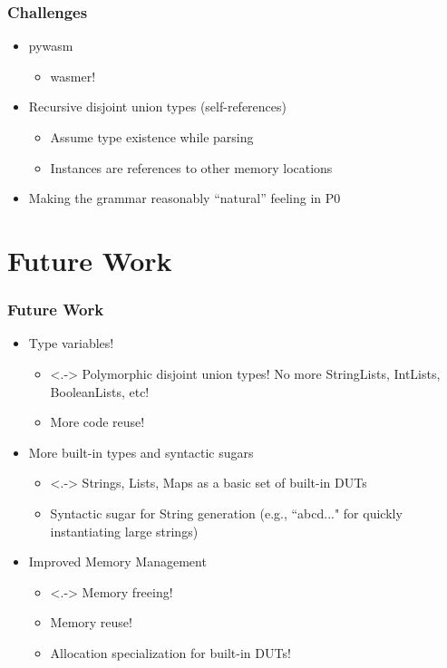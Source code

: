 \documentclass{beamer}
\begin{document}
\begin{frame}
 \frametitle{Challenges}
 \begin{itemize}
  \item<1-> pywasm
  \begin{itemize}
    \item<2-> wasmer!
  \end{itemize}
  
  \item<3-> Recursive disjoint union types (self-references)
  \begin{itemize}
    \item<4-> Assume type existence while parsing
    \item<5-> Instances are references to other memory locations
  \end{itemize}
  
  \item<6-> Making the grammar reasonably ``natural'' feeling in P0
 \end{itemize}

\end{frame}


\section{Future Work}

\begin{frame}
\frametitle{Future Work}

\begin{itemize}
 \item<1-> Type variables!
 \begin{itemize}
  \item<.-> Polymorphic disjoint union types! No more StringLists, IntLists, BooleanLists, etc!
  \item More code reuse!
 \end{itemize}
 
 \item<2-> More built-in types and syntactic sugars
 \begin{itemize}
 \item<.-> Strings, Lists, Maps as a basic set of built-in DUTs
 \item Syntactic sugar for String generation (e.g., ``abcd..." for quickly instantiating large strings)
 \end{itemize}
 
 \item<3-> Improved Memory Management
 \begin{itemize}
  \item<.-> Memory freeing!
  \item Memory reuse!
  \item Allocation specialization for built-in DUTs!
 \end{itemize}

\end{itemize}

\end{frame}
\end{document}
